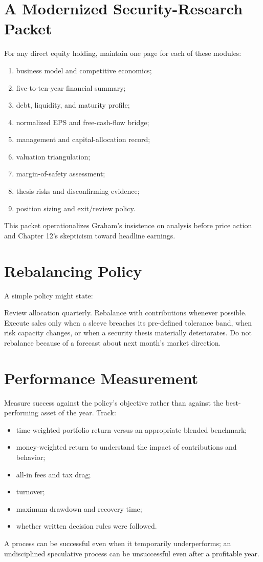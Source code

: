 \documentclass[11pt]{article}
\begin{document}
\section{A Modernized Security-Research Packet}
For any direct equity holding, maintain one page for each of these modules:
\begin{enumerate}
\item business model and competitive economics;
\item five-to-ten-year financial summary;
\item debt, liquidity, and maturity profile;
\item normalized EPS and free-cash-flow bridge;
\item management and capital-allocation record;
\item valuation triangulation;
\item margin-of-safety assessment;
\item thesis risks and disconfirming evidence;
\item position sizing and exit/review policy.
\end{enumerate}
This packet operationalizes Graham's insistence on analysis before price action and Chapter 12's skepticism toward headline earnings.

\section{Rebalancing Policy}
A simple policy might state:
\begin{principlebox}
Review allocation quarterly. Rebalance with contributions whenever possible. Execute sales only when a sleeve breaches its pre-defined tolerance band, when risk capacity changes, or when a security thesis materially deteriorates. Do not rebalance because of a forecast about next month's market direction.
\end{principlebox}

\section{Performance Measurement}
Measure success against the policy's objective rather than against the best-performing asset of the year. Track:
\begin{itemize}
\item time-weighted portfolio return versus an appropriate blended benchmark;
\item money-weighted return to understand the impact of contributions and behavior;
\item all-in fees and tax drag;
\item turnover;
\item maximum drawdown and recovery time;
\item whether written decision rules were followed.
\end{itemize}
A process can be successful even when it temporarily underperforms; an undisciplined speculative process can be unsuccessful even after a profitable year.
\end{document}
